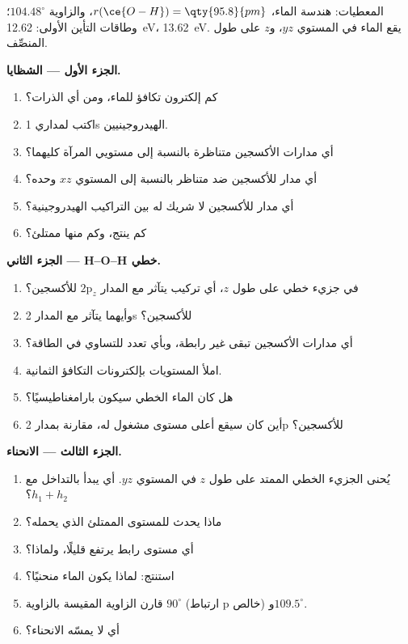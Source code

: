 \begin{problem}
\label{pb:b2:fragment-orbitals:1}
المعطيات: هندسة الماء، $r(\ce{O-H}) = \qty{95.8}{pm}$، والزاوية
$104.48^\circ$؛ وطاقات التأين الأولى:  \qty{12.62}{eV}، 
\qty{13.62}{eV}. يقع الماء في المستوي $yz$، و$z$ على طول المنصِّف.

\medskip
\noindent\textbf{الجزء الأول --- الشظايا.}
\begin{enumerate}
  \item كم إلكترون تكافؤ للماء، ومن أي الذرات؟
  \item اكتب  لمداري 1s الهيدروجينيين.
  \item أي مدارات الأكسجين متناظرة بالنسبة إلى مستويي المرآة كليهما؟
  \item أي مدار للأكسجين ضد متناظر بالنسبة إلى المستوي $xz$ وحده؟
  \item أي مدار للأكسجين لا شريك له بين التراكيب الهيدروجينية؟
  \item كم  ينتج، وكم منها ممتلئ؟
\end{enumerate}

\medskip
\noindent\textbf{الجزء الثاني --- H--O--H خطي.}
\begin{enumerate}[resume]
  \item في جزيء خطي على طول $z$، أي تركيب يتآثر مع
        المدار $2\mathrm p_z$ للأكسجين؟
  \item وأيهما يتآثر مع المدار 2s للأكسجين؟
  \item أي مدارات الأكسجين تبقى غير رابطة، وبأي تعدد للتساوي في الطاقة؟
  \item املأ المستويات بإلكترونات التكافؤ الثمانية.
  \item هل كان الماء الخطي سيكون بارامغناطيسيًا؟
  \item أين كان سيقع أعلى مستوى مشغول له، مقارنة بمدار 2p
        للأكسجين؟
\end{enumerate}

\medskip
\noindent\textbf{الجزء الثالث --- الانحناء.}
\begin{enumerate}[resume]
  \item يُحنى الجزيء الخطي الممتد على طول $z$ في المستوي $yz$. أي
         يبدأ بالتداخل مع $h_1 + h_2$؟
  \item ماذا يحدث للمستوى الممتلئ الذي يحمله؟
  \item أي مستوى رابط يرتفع قليلًا، ولماذا؟
  \item استنتج: لماذا يكون الماء منحنيًا؟
  \item قارن الزاوية المقيسة بالزاوية $90^\circ$ (ارتباط p خالص) و$109.5^\circ$.
  \item أي  لا يمسّه الانحناء؟
\end{enumerate}


\end{problem}
